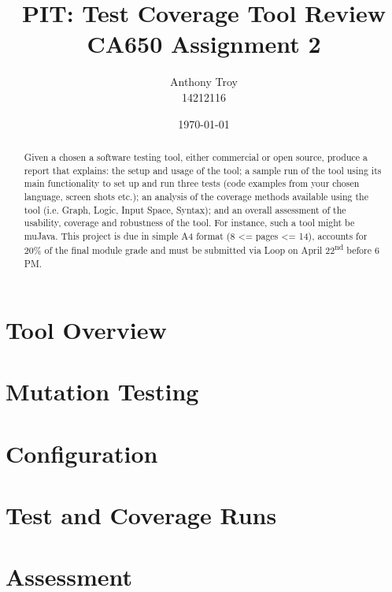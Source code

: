 \documentclass[a4paper]{article}
\title{PIT: Test Coverage Tool Review\\ \Large{CA650 Assignment 2}}
\author{Anthony Troy\\ \small{14212116}}
\date{\today}
\begin{document}
\maketitle

\renewcommand{\abstractname}{Requirements}
\begin{abstract}
Given a chosen a software testing tool, either commercial or open source, produce a report that explains: the setup and usage of the tool; a sample run of the tool using its main functionality to set up and run three tests (code examples from your chosen language, screen shots etc.); an analysis of the coverage methods available using the tool (i.e. Graph, Logic, Input Space, Syntax); and an overall assessment of the usability, coverage and robustness of the tool. For instance, such a tool might be muJava. This project is due in simple A4 format (8 \textless= pages \textless= 14), accounts for  20\% of the final module grade and must be submitted via Loop on April 22\textsuperscript{nd} before 6 \MakeUppercase{pm}.



\end{abstract}

\vspace{3.5cm}
\tableofcontents

\newpage

\section{Tool Overview}
\citep{Claus} \lipsum 


\section{Mutation Testing}
\lipsum


\section{Configuration}
\lipsum


\section{Test and Coverage Runs}
\lipsum


\section{Assessment}
\lipsum

\vspace{-7.5mm}
\renewcommand{\refname}{\section*{References}}

\end{document}
